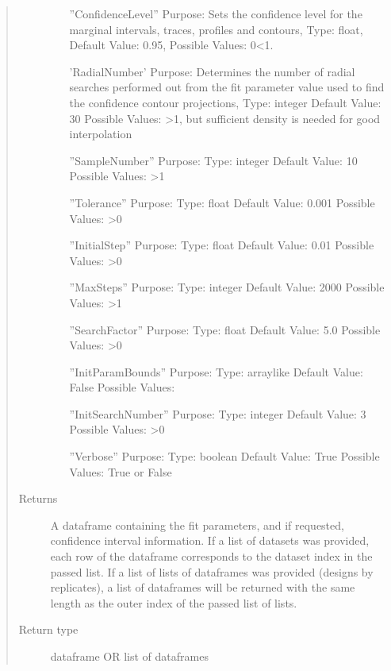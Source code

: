 \documentclass[letterpaper,10pt,english,openany,oneside]{sphinxmanual}
\begin{document}
\begin{fulllineitems}
\begin{fulllineitems}
\begin{quote}
\begin{description}
\begin{itemize}
”ConfidenceLevel” \textendash{}
Purpose: Sets the confidence level for the marginal intervals, traces, profiles and contours,
Type: float,
Default Value: 0.95,
Possible Values: 0\textless{}1.

’RadialNumber’ \textendash{}
Purpose: Determines the number of radial searches performed out from the fit
parameter value used to find the confidence contour projections,
Type: integer
Default Value: 30
Possible Values: \textgreater{}1, but sufficient density is needed for good interpolation

”SampleNumber” \textendash{}
Purpose:
Type: integer
Default Value: 10
Possible Values: \textgreater{}1

”Tolerance” \textendash{}
Purpose:
Type: float
Default Value: 0.001
Possible Values: \textgreater{}0

”InitialStep” \textendash{}
Purpose:
Type: float
Default Value: 0.01
Possible Values: \textgreater{}0

”MaxSteps” \textendash{}
Purpose:
Type: integer
Default Value: 2000
Possible Values: \textgreater{}1

”SearchFactor” \textendash{}
Purpose:
Type: float
Default Value: 5.0
Possible Values: \textgreater{}0

”InitParamBounds” \textendash{}
Purpose:
Type: array\sphinxhyphen{}like
Default Value: False
Possible Values:

”InitSearchNumber” \textendash{}
Purpose:
Type: integer
Default Value: 3
Possible Values: \textgreater{}0

”Verbose” \textendash{}
Purpose:
Type: boolean
Default Value: True
Possible Values: True or False


\end{itemize}

\item[{Returns}] \leavevmode
A dataframe containing the fit parameters,
and if requested, confidence interval information. If a list of datasets was provided,
each row of the dataframe corresponds to the dataset index in the passed list.
If a list of lists of dataframes was provided (designs by replicates),
a list of dataframes will be returned with the same length as the outer index of the
passed list of lists.

\item[{Return type}] \leavevmode
dataframe OR list of dataframes

\end{description}\end{quote}


\end{fulllineitems}
\end{fulllineitems}
\end{document}
